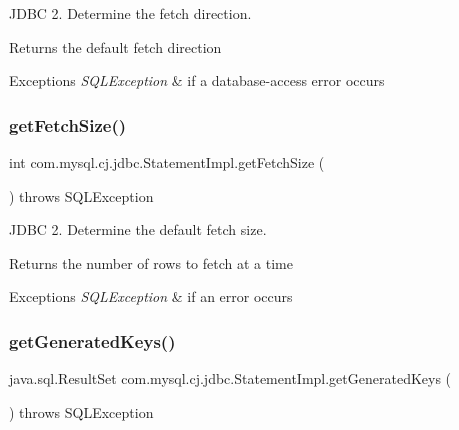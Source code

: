 J\+D\+BC 2. Determine the fetch direction.

\begin{DoxyReturn}{Returns}
the default fetch direction
\end{DoxyReturn}

\begin{DoxyExceptions}{Exceptions}
{\em S\+Q\+L\+Exception} & if a database-\/access error occurs \\
\hline
\end{DoxyExceptions}
\mbox{\label{classcom_1_1mysql_1_1cj_1_1jdbc_1_1_statement_impl_a2e309596729b0de9bc9230e745c9350f}} 
\subsubsection{\texorpdfstring{get\+Fetch\+Size()}{getFetchSize()}}
{\footnotesize\ttfamily int com.\+mysql.\+cj.\+jdbc.\+Statement\+Impl.\+get\+Fetch\+Size (\begin{DoxyParamCaption}{ }\end{DoxyParamCaption}) throws S\+Q\+L\+Exception}

J\+D\+BC 2. Determine the default fetch size.

\begin{DoxyReturn}{Returns}
the number of rows to fetch at a time
\end{DoxyReturn}

\begin{DoxyExceptions}{Exceptions}
{\em S\+Q\+L\+Exception} & if an error occurs \\
\hline
\end{DoxyExceptions}
\mbox{\label{classcom_1_1mysql_1_1cj_1_1jdbc_1_1_statement_impl_a498dcb08802ab5ebfb700b3bae3ff1f2}} 
\subsubsection{\texorpdfstring{get\+Generated\+Keys()}{getGeneratedKeys()}}
{\footnotesize\ttfamily java.\+sql.\+Result\+Set com.\+mysql.\+cj.\+jdbc.\+Statement\+Impl.\+get\+Generated\+Keys (\begin{DoxyParamCaption}{ }\end{DoxyParamCaption}) throws S\+Q\+L\+Exception}


